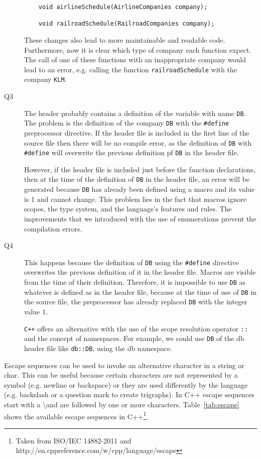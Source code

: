 \documentclass[a4paper]{article}
\newcounter{exerciseCount}
\newcommand{\exercise}[1]{\addtocounter{exerciseCount}{1} \noindent \medskip {\large \textsf{\textbf{Exercise \arabic{exerciseCount} #1}}} \par}
\begin{document}
\begin{description}
	\begin{verbatim}
	void airlineSchedule(AirlineCompanies company);
	
	void railroadSchedule(RailroadCompanies company);
	\end{verbatim}
	
	These changes also lead to more maintainable and readable code. Furthermore, now it is clear which type of company each function expect. The call of one of these functions with an inappropriate company would lead to an error, e.g. calling the function \verb|railroadSchedule| with the company \verb|KLM|.
	\item[Q3]\-
	The header probably contains a definition of the variable with name \verb|DB|. The problem is the definition of the company \verb|DB| with the \verb|#define| preprocessor directive. If the header file is included in the first line of the source file then there will be no compile error, as the definition of \verb|DB| with \verb|#define| will overwrite the previous definition pf \verb|DB| in the header file.
	
	However, if the header file is included just before the function declarations, then at the time of the definition of \verb|DB| in the header file, an error will be generated because \verb|DB| has already been defined using a macro and its value is 1 and cannot change. This problem lies in the fact that macros ignore scopes, the type system, and the language's features and rules. The improvements that we introduced with the use of enumerations prevent the compilation errors.
	\item[Q4]\-
	This happens because the definition of \verb|DB| using the \verb|#define| directive overwrites the previous definition of it in the header file. Macros are visible from the time of their definition. Therefore, it is impossible to use \verb|DB| as whatever is defined as in the header file, because at the time of use of \verb|DB| in the source file, the preprocessor has already replaced \verb|DB| with the integer value 1.
	
	\verb|C++| offers an alternative with the use of the scope resolution operator \verb|::| and the concept of namespaces. For example, we could use \verb|DB| of the db header file like \verb|db::DB|, using the db namespace.
\end{description}

\exercise{}

Escape sequences can be used to invoke an alternative character in a string or char. This can be useful because certain characters are not represented by a symbol (e.g. newline or backspace) or they are used differently by the language (e.g. backslash or a question mark to create trigraphs).  In C++ escape sequences start with a \textbackslash  and are followed by one or more characters. Table~\ref{tab:escape} shows the available escape sequences in C++\footnote{Taken from ISO/IEC 14882-2011 and http://en.cppreference.com/w/cpp/language/escape}.
\end{document}
